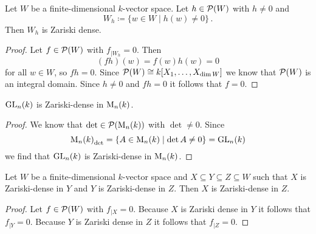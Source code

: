 \begin{lem}
  Let $W$ be a finite-dimensional $k$-vector space.
  Let $h \in \mathcal{P}(W)$ with $h \neq 0$ and
  \[
              W_h
    \coloneqq \{
                w \in W
              \mid
                h(w) \neq 0
              \} \,.
  \]
  Then $W_h$ is Zariski dense.
\end{lem}
\begin{proof}
  Let $f \in \mathcal{P}(W)$ with $f_{|W_h} = 0$. Then
  \[
      (fh)(w)
    = f(w)h(w)
    = 0
  \]
  for all $w \in W$, so $fh = 0$.
  Since $\mathcal{P}(W) \cong k[X_1, \dotsc, X_{\dim W}]$ we know that $\mathcal{P}(W)$ is an integral domain.
  Since $h \neq 0$ and $fh = 0$ it follows that $f = 0$.
\end{proof}


\begin{cor}
  $\operatorname{GL}_n(k)$ is Zariski-dense in $\operatorname{M}_n(k)$.
\end{cor}
\begin{proof}
  We know that $\det \in \mathcal{P}(\operatorname{M}_n(k))$ with $\det \neq 0$.
  Since
  \[
    {\operatorname{M}_n(k)}_{\det}
    = \{
        A \in \operatorname{M}_n(k)
      \mid
        \det A \neq 0
      \}
    = \operatorname{GL}_n(k)
  \]
  we find that $\operatorname{GL}_n(k)$ is Zariski-dense in $\operatorname{M}_n(k)$.
\end{proof}


\begin{prop}
  Let $W$ be a finite-dimensional $k$-vector space and $X \subseteq Y \subseteq Z \subseteq W$ such that $X$ is Zariski-dense in $Y$ and $Y$ is Zariski-dense in $Z$.
  Then $X$ is Zariski-dense in $Z$.
\end{prop}
\begin{proof}
  Let $f \in \mathcal{P}(W)$ with $f_{|X} = 0$.
  Because $X$ is Zariski dense in $Y$ it follows that $f_{|Y} = 0$.
  Because $Y$ is Zariski dense in $Z$ it follows that $f_{|Z} = 0$.
\end{proof}


